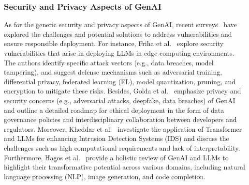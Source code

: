 \documentclass[5p,twocolumn]{elsarticle}
\begin{document}
\subsubsection{Security and Privacy Aspects of GenAI}
As for the generic security and privacy aspects of GenAI, recent surveys~\cite{friha2024llm,golda2024privacy,kheddar2024transformers,hagos2024recent} have explored the challenges and potential solutions to address vulnerabilities and ensure responsible deployment. For instance, Friha et al.~\cite{friha2024llm} explore security vulnerabilities that arise in deploying LLMs in edge computing environments. The authors identify specific attack vectors (e.g., data breaches, model tampering), and suggest defense mechanisms such as adversarial training, differential privacy, federated learning (FL), model quantization, pruning, and encryption to mitigate these risks. Besides, Golda et al.~\cite{golda2024privacy} emphasize privacy and security concerns (e.g., adversarial attacks, deepfake, data breaches) of GenAI and outline a detailed roadmap for ethical deployment in the form of data governance policies and interdisciplinary collaboration between developers and regulators. Moreover, Kheddar et al.~\cite{kheddar2024transformers} investigate the application of Transformer and LLMs for enhancing Intrusion Detection Systems (IDS) and discuss the challenges such as high computational requirements and lack of interpretability. Furthermore, Hagos et al.~\cite{hagos2024recent} provide a holistic review of GenAI and LLMs to highlight their transformative potential across various domains, including natural language processing (NLP), image generation, and code completion.


	
\end{document}
